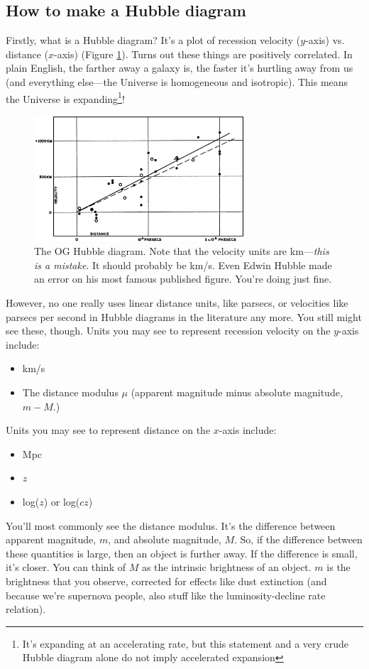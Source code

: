 \subsection{How to make a Hubble diagram}
Firstly, what is a Hubble diagram? It's a plot of recession velocity ($y$-axis) vs. distance ($x$-axis) (Figure \ref{fig:oghubble}). Turns out these things are positively correlated. In plain English, the farther away a galaxy is, the faster it's hurtling away from us (and everything else---the Universe is homogeneous and isotropic). This means the Universe is expanding\footnote{It's expanding at an accelerating rate, but this statement and a very crude Hubble diagram alone do not imply accelerated expansion}!

\begin{figure}[h!]
    \centering
    \includegraphics[width=0.7\textwidth]{figs/hubble_diagram_og.jpeg}
    \caption{The OG Hubble diagram. Note that the velocity units are km---\textit{this is a mistake}. It should probably be km/s. Even Edwin Hubble made an error on his most famous published figure. You're doing just fine.}
    \label{fig:oghubble}
\end{figure}

However, no one really uses linear distance units, like parsecs, or velocities like parsecs per second in Hubble diagrams in the literature any more. You still might see these, though. Units you may see to represent recession velocity on the $y$-axis include:
\begin{itemize}
    \item km/s
    \item The distance modulus $\mu$ (apparent magnitude minus absolute magnitude, $m-M$.)
\end{itemize}
Units you may see to represent distance on the $x$-axis include:
\begin{itemize}
    \item Mpc
    \item $z$
    \item log($z$) or log($cz$)
\end{itemize}
You'll most commonly see the distance modulus. It's the difference between apparent magnitude, $m$, and absolute magnitude, $M$. So, if the difference between these quantities is large, then an object is further away. If the difference is small, it's closer. You can think of $M$ as the intrinsic brightness of an object. $m$ is the brightness that you observe, corrected for effects like dust extinction (and because we're supernova people, also stuff like the luminosity-decline rate relation). 

